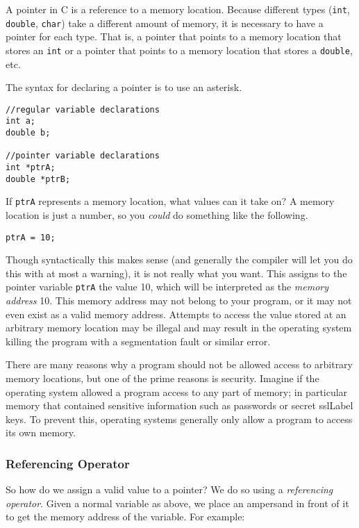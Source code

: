 A \gls{pointer} in C is a reference to a memory location.  
Because different types (\texttt{int}, \texttt{double}, 
\texttt{char}) take a different amount of memory, it is
necessary to have a pointer for each type.  That is, a pointer
that points to a memory location that stores an \texttt{int}
or a pointer that points to a memory location that stores a 
\texttt{double}, etc.

The syntax for declaring a pointer is to use an asterisk.

\begin{verbatim}
//regular variable declarations
int a;
double b;

//pointer variable declarations
int *ptrA;
double *ptrB;
\end{verbatim}

If \texttt{ptrA} represents a memory location, what values can
it take on?  A memory location is just a number, 
so you \emph{could} do something like the following.

\texttt{ptrA = 10;} 

Though syntactically this makes sense (and generally the compiler 
will let you do this with at most a warning), it is not really what you want.  
This assigns to the pointer variable \texttt{ptrA} the value 10, 
which will be interpreted as the \emph{memory address} 10.  This
memory address may not belong to your program, or it may not even
exist as a valid memory address.  Attempts to access the value stored
at an arbitrary memory location may be illegal and may result in the
operating system killing the program with a  
\gls{segmentation fault} or similar error.

There are many reasons why a program should not be allowed 
access to arbitrary memory locations, but one of the prime reasons
is security.  Imagine if the operating system allowed a program 
access to any part of memory; in particular memory that contained
sensitive information such as passwords or secret \gls{sslLabel} 
keys.  To prevent this, operating systems generally only allow a
program to access its own memory.

\subsubsection{Referencing Operator}

So how do we assign a valid value to a pointer?  We do so using
a \emph{referencing operator}.  Given a normal variable as above,
we place an ampersand in front of it to get the memory address of
the variable.  For example:

